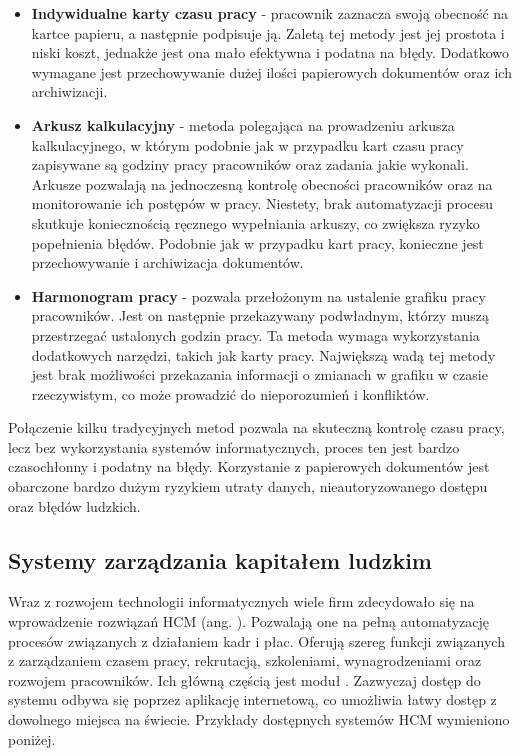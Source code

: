 \begin{itemize}
    \item \textbf{Indywidualne karty czasu pracy} - pracownik zaznacza swoją obecność na kartce papieru, a następnie podpisuje ją. Zaletą tej metody jest jej prostota i niski koszt, jednakże jest ona mało efektywna i podatna na błędy. Dodatkowo wymagane jest przechowywanie dużej ilości papierowych dokumentów oraz ich archiwizacji.
    \item \textbf{Arkusz kalkulacyjny} - metoda polegająca na prowadzeniu arkusza kalkulacyjnego, w którym podobnie jak w przypadku kart czasu pracy zapisywane są godziny pracy pracowników oraz zadania jakie wykonali. Arkusze pozwalają na jednoczesną kontrolę obecności pracowników oraz na monitorowanie ich postępów w pracy. Niestety, brak automatyzacji procesu skutkuje koniecznością ręcznego wypełniania arkuszy, co zwiększa ryzyko popełnienia błędów. Podobnie jak w przypadku kart pracy, konieczne jest przechowywanie i archiwizacja dokumentów.
    \item \textbf{Harmonogram pracy} - pozwala przełożonym na ustalenie grafiku pracy pracowników. Jest on następnie przekazywany podwładnym, którzy muszą przestrzegać ustalonych godzin pracy. Ta metoda wymaga wykorzystania dodatkowych narzędzi, takich jak karty pracy. Największą wadą tej metody jest brak możliwości przekazania informacji o zmianach w grafiku w czasie rzeczywistym, co może prowadzić do nieporozumień i konfliktów.
\end{itemize}

Połączenie kilku tradycyjnych metod pozwala na skuteczną kontrolę czasu pracy, lecz bez wykorzystania systemów informatycznych, proces ten jest bardzo czasochłonny i podatny na błędy. Korzystanie z papierowych dokumentów jest obarczone bardzo dużym ryzykiem utraty danych, nieautoryzowanego dostępu oraz błędów ludzkich.

\subsection{Systemy zarządzania kapitałem ludzkim}

Wraz z rozwojem technologii informatycznych wiele firm zdecydowało się na wprowadzenie rozwiązań HCM (ang. ). Pozwalają one na pełną automatyzację procesów związanych z działaniem kadr i płac. Oferują szereg funkcji związanych z zarządzaniem czasem pracy, rekrutacją, szkoleniami, wynagrodzeniami oraz rozwojem pracowników. Ich główną częścią jest moduł . Zazwyczaj dostęp do systemu odbywa się poprzez aplikację internetową, co umożliwia łatwy dostęp z dowolnego miejsca na świecie. Przykłady dostępnych systemów HCM wymieniono poniżej.

